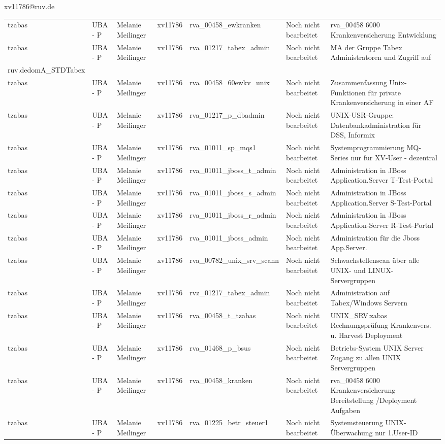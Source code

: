 \documentclass[a4paper,landscape,12pt]{letter}
\begin{document}
\begin{letter}{xv11786@ruv.de\hfill \break}
\begin{tiny}
\begin{longtable}{|p{35mm}|p{15mm}|p{25mm}|p{10mm}|p{40mm}|p{50mm}|p{50mm}|}
tzabas & UBA - P & Melanie Meilinger & xv11786 & rva\_00458\_ewkranken & Noch nicht bearbeitet & rva\_00458 6000 Krankenversicherung Entwicklung \\
tzabas & UBA - P & Melanie Meilinger & xv11786 & rva\_01217\_tabex\_admin & Noch nicht bearbeitet & MA der Gruppe Tabex Administratoren und Zugriff auf \\ruv.dedomA\_STDTabex \\
tzabas & UBA - P & Melanie Meilinger & xv11786 & rva\_00458\_60ewkv\_unix & Noch nicht bearbeitet & Zusammenfassung Unix-Funktionen für private Krankenversicherung in einer AF \\
tzabas & UBA - P & Melanie Meilinger & xv11786 & rva\_01217\_p\_dbadmin & Noch nicht bearbeitet & UNIX-USR-Gruppe: Datenbankadministration für  DSS, Informix \\
tzabas & UBA - P & Melanie Meilinger & xv11786 & rva\_01011\_sp\_mqs1 & Noch nicht bearbeitet & Systemprogrammierung MQ-Series nur fur XV-User - dezentral \\
tzabas & UBA - P & Melanie Meilinger & xv11786 & rva\_01011\_jboss\_t\_admin & Noch nicht bearbeitet & Administration in JBoss Application.Server T-Test-Portal \\
tzabas & UBA - P & Melanie Meilinger & xv11786 & rva\_01011\_jboss\_s\_admin & Noch nicht bearbeitet & Administration in JBoss Application.Server S-Test-Portal \\
tzabas & UBA - P & Melanie Meilinger & xv11786 & rva\_01011\_jboss\_r\_admin & Noch nicht bearbeitet & Administration in JBoss Application-Server R-Test-Portal \\
tzabas & UBA - P & Melanie Meilinger & xv11786 & rva\_01011\_jboss\_admin & Noch nicht bearbeitet & Administration für die Jboss App.Server. \\
tzabas & UBA - P & Melanie Meilinger & xv11786 & rva\_00782\_unix\_srv\_scann & Noch nicht bearbeitet & Schwachstellenscan über alle UNIX- und LINUX-Servergruppen \\
tzabas & UBA - P & Melanie Meilinger & xv11786 & rvz\_01217\_tabex\_admin & Noch nicht bearbeitet & Administration auf Tabex/Windows Servern \\
tzabas & UBA - P & Melanie Meilinger & xv11786 & rva\_00458\_t\_tzabas & Noch nicht bearbeitet & UNIX\_SRV:zabas Rechnungsprüfung Krankenvers. u. Harvest Deployment \\
tzabas & UBA - P & Melanie Meilinger & xv11786 & rva\_01468\_p\_bsus & Noch nicht bearbeitet & Betriebs-System UNIX Server Zugang zu allen UNIX Servergruppen \\
tzabas & UBA - P & Melanie Meilinger & xv11786 & rva\_00458\_kranken & Noch nicht bearbeitet & rva\_00458 6000 Krankenversicherung Bereitstellung /Deployment Aufgaben \\
tzabas & UBA - P & Melanie Meilinger & xv11786 & rva\_01225\_betr\_steuer1 & Noch nicht bearbeitet & Systemsteuerung UNIX-Überwachung nur 1.User-ID \\


\end{longtable}
\end{tiny}
\end{letter}
\end{document}
